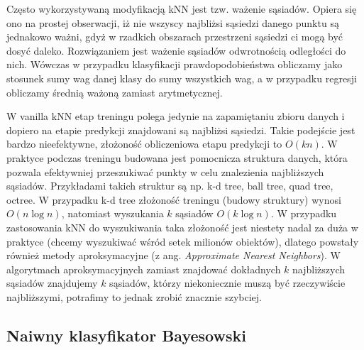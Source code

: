 \documentclass{myclass}
\begin{document}
Często wykorzystywaną modyfikacją kNN jest tzw. ważenie sąsiadów. Opiera się ono na prostej
obserwacji, iż nie wszyscy najbliżsi sąsiedzi danego punktu są jednakowo ważni, gdyż w rzadkich
obszarach przestrzeni sąsiedzi ci mogą być dosyć daleko. Rozwiązaniem jest ważenie sąsiadów
odwrotnością odległości do nich. Wówczas w przypadku klasyfikacji prawdopodobieństwa obliczamy jako
stosunek sumy wag danej klasy do sumy wszystkich wag, a w przypadku regresji obliczamy średnią
ważoną zamiast arytmetycznej.

W vanilla kNN etap treningu polega jedynie na zapamiętaniu zbioru danych i dopiero na etapie
predykcji znajdowani są najbliżsi sąsiedzi. Takie podejście jest bardzo nieefektywne, złożoność
obliczeniowa etapu predykcji to \(O(kn)\). W praktyce podczas treningu budowana jest pomocnicza
struktura danych, która pozwala efektywniej przeszukiwać punkty w celu znalezienia najbliższych
sąsiadów. Przykładami takich struktur są np. k-d tree, ball tree, quad tree, octree. W przypadku k-d
tree złożoność treningu (budowy struktury) wynosi \(O(n \log n)\), natomiast wyszukania \(k\)
sąsiadów \(O(k \log n)\). W przypadku zastosowania kNN do wyszukiwania taka złożoność jest niestety
nadal za duża w praktyce (chcemy wyszukiwać wśród setek milionów obiektów), dlatego powstały również
metody aproksymacyjne (z ang. \textit{Approximate Nearest Neighbors}). W algorytmach
aproksymacyjnych zamiast znajdować dokładnych \(k\) najbliższych sąsiadów znajdujemy \(k\) sąsiadów,
którzy niekoniecznie muszą być rzeczywiście najbliższymi, potrafimy to jednak zrobić znacznie
szybciej.

\subsection{Naiwny klasyfikator Bayesowski}
\end{document}
